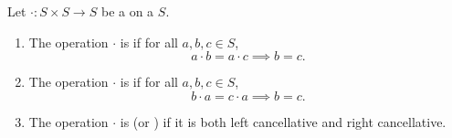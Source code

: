 \begin{definition} \label{definition:cancellative_binary_operation_on_a_set}
    Let $\cdot : S \times S \to S$ be a  on a  $S$.
    \begin{enumerate}
        \item The operation $\cdot$ is  if for all $a,b,c \in S$,
        $$a \cdot b = a \cdot c \implies b = c.$$
        \item The operation $\cdot$ is  if for all $a,b,c \in S$,
        $$b \cdot a = c \cdot a \implies b = c.$$
        \item The operation $\cdot$ is  (or ) if it is both left cancellative and right cancellative.
    \end{enumerate}
\end{definition}